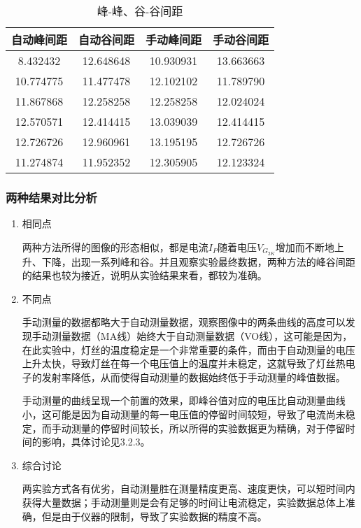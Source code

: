 \documentclass[dvipsnames, svgnames,a4paper,11pt]{article}
\begin{document}
		\begin{table}[H]
			\centering\caption{峰-峰、谷-谷间距}
			\begin{tabular}{cccc}
			\hline
			 自动峰间距 & 自动谷间距 & 手动峰间距 & 手动谷间距 \\
			\hline
		
			 8.432432 & 12.648648 & 10.930931 & 13.663663 \\
			 10.774775 & 11.477478 & 12.102102 & 11.789790 \\
			 11.867868 & 12.258258 & 12.258258 & 12.024024 \\
			12.570571 & 12.414415 & 13.039039 & 12.414415 \\
			12.726726 & 12.960961 & 13.195195 & 12.726726 \\
			\hline
			  11.274874 & 11.952352 & 12.305905 & 12.123324 \\
			  \bottomrule
			\end{tabular}
			
			
		\end{table}
		\subsubsection{两种结果对比分析}
		
		
	\begin{enumerate}
		\item 相同点
		
		\quad \quad 两种方法所得的图像的形态相似，都是电流$I_{P}$随着电压$V_{G_{2K}}$增加而不断地上升、下降，出现一系列峰和谷。并且观察实验最终数据，两种方法的峰谷间距的结果也较为接近，说明从实验结果来看，都较为准确。

		 \item 不同点
		 
		\quad \quad 手动测量的数据都略大于自动测量数据，观察图像中的两条曲线的高度可以发现手动测量数据（MA线）始终大于自动测量数据（VO线），这可能是因为，在此实验中，灯丝的温度稳定是一个非常重要的条件，而由于自动测量的电压上升太快，导致灯丝在每一个电压值上的温度并未稳定，这就导致了灯丝热电子的发射率降低，从而使得自动测量的数据始终低于手动测量的峰值数据。

		\quad \quad 手动测量的曲线呈现一个前置的效果，即峰谷值对应的电压比自动测量曲线小，这可能是因为自动测量的每一电压值的停留时间较短，导致了电流尚未稳定，而手动测量的停留时间较长，所以所得的实验数据更为精确，对于停留时间的影响，具体讨论见3.2.3。
	
         \item 综合讨论
         
		 \quad \quad  两实验方式各有优劣，自动测量胜在测量精度更高、速度更快，可以短时间内获得大量数据；手动测量则是会有足够的时间让电流稳定，实验数据总体上准确，但是由于仪器的限制，导致了实验数据的精度不高。
\end{enumerate}
\end{document}
